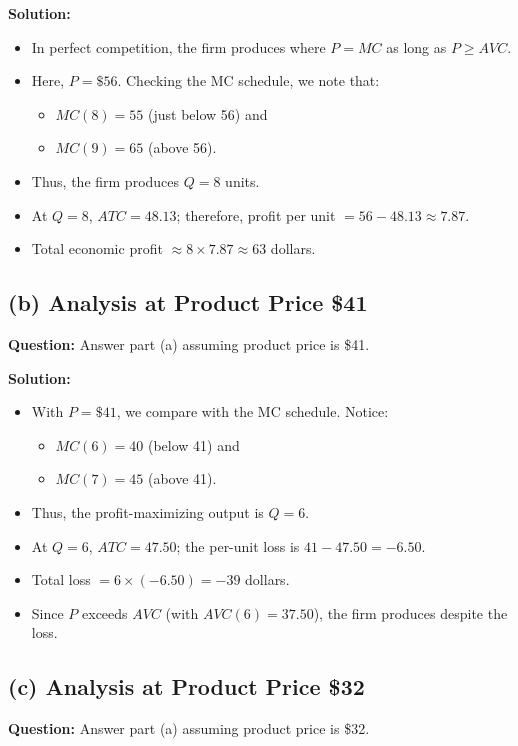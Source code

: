 \documentclass[12pt]{article}
\begin{document}
\textbf{Solution:}
\begin{itemize}[noitemsep]
  \item In perfect competition, the firm produces where \(P = MC\) as long as \(P \geq AVC\).
  \item Here, \(P = \$56\). Checking the MC schedule, we note that:
    \begin{itemize}[noitemsep]
      \item \(MC(8) = 55\) (just below 56) and
      \item \(MC(9) = 65\) (above 56).
    \end{itemize}
  \item Thus, the firm produces \(Q=8\) units.
  \item At \(Q=8\), \(ATC = 48.13\); therefore, profit per unit \(= 56 - 48.13 \approx 7.87\).
  \item Total economic profit \( \approx 8 \times 7.87 \approx 63\) dollars.
\end{itemize}

\subsection*{(b) Analysis at Product Price \$41}
\textbf{Question:} Answer part (a) assuming product price is \$41.

\textbf{Solution:}
\begin{itemize}[noitemsep]
  \item With \(P = \$41\), we compare with the MC schedule. Notice:
    \begin{itemize}[noitemsep]
      \item \(MC(6) = 40\) (below 41) and
      \item \(MC(7) = 45\) (above 41).
    \end{itemize}
  \item Thus, the profit-maximizing output is \(Q=6\).
  \item At \(Q=6\), \(ATC = 47.50\); the per-unit loss is \(41 - 47.50 = -6.50\).
  \item Total loss \(= 6 \times (-6.50) = -39\) dollars.
  \item Since \(P\) exceeds \(AVC\) (with \(AVC(6) = 37.50\)), the firm produces despite the loss.
\end{itemize}

\subsection*{(c) Analysis at Product Price \$32}
\textbf{Question:} Answer part (a) assuming product price is \$32.
\end{document}
